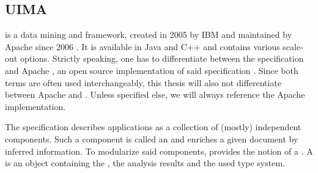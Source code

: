 
\subsection{UIMA}
\uima{} is a data mining and \nlp{} framework, created in 2005 by IBM \cite{ferrucci2004uima} and maintained by Apache since 2006 \cite{uimacpe}. It is available in Java and C++ and contains various scale-out options. 
Strictly speaking, one has to differentiate between the \uima{} specification and Apache \uima{}, an open source implementation of said specification \cite{OASIS:UIMA:2009}. Since both terms are often used interchangeably, this thesis will also not differentiate between Apache \uima{} and \uima{}. Unless specified else, we will always reference the Apache \uima{} implementation.

The \uima{} specification describes \nlp{} applications as a collection of (mostly) independent components. Such a component is called an \anen{} and enriches a given document by inferred information. To modularize said components, \uima{} provides the notion of a \cas{}. A \cas{} is an object containing the \sofa{}, the analysis results and the used type system.


